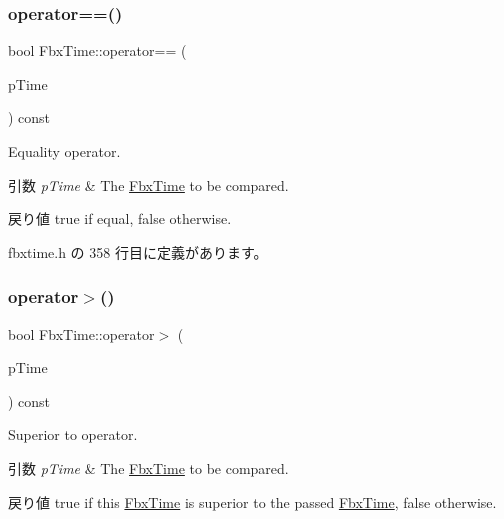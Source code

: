 \mbox{\label{class_fbx_time_a9dae81e92ed8d293c22d0d09cc0d3ecc}} 
\subsubsection{\texorpdfstring{operator==()}{operator==()}}
{\footnotesize\ttfamily bool Fbx\+Time\+::operator== (\begin{DoxyParamCaption}\item[{const \hyperlink{class_fbx_time}{Fbx\+Time} \&}]{p\+Time }\end{DoxyParamCaption}) const\hspace{0.3cm}{\ttfamily [inline]}}

Equality operator. 
\begin{DoxyParams}{引数}
{\em p\+Time} & The \hyperlink{class_fbx_time}{Fbx\+Time} to be compared. \\
\hline
\end{DoxyParams}
\begin{DoxyReturn}{戻り値}
{\ttfamily true} if equal, {\ttfamily false} otherwise. 
\end{DoxyReturn}


 fbxtime.\+h の 358 行目に定義があります。

\mbox{\label{class_fbx_time_a0cce77e50858f177fa1c11556277010e}} 
\subsubsection{\texorpdfstring{operator$>$()}{operator>()}}
{\footnotesize\ttfamily bool Fbx\+Time\+::operator$>$ (\begin{DoxyParamCaption}\item[{const \hyperlink{class_fbx_time}{Fbx\+Time} \&}]{p\+Time }\end{DoxyParamCaption}) const\hspace{0.3cm}{\ttfamily [inline]}}

Superior to operator. 
\begin{DoxyParams}{引数}
{\em p\+Time} & The \hyperlink{class_fbx_time}{Fbx\+Time} to be compared. \\
\hline
\end{DoxyParams}
\begin{DoxyReturn}{戻り値}
{\ttfamily true} if this \hyperlink{class_fbx_time}{Fbx\+Time} is superior to the passed \hyperlink{class_fbx_time}{Fbx\+Time}, {\ttfamily false} otherwise. 
\end{DoxyReturn}



